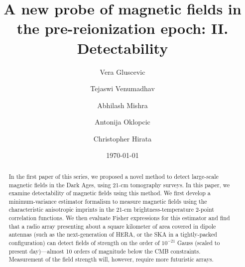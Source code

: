 \documentclass[aps,prd,twocolumn,floatfix,showpacs,superscriptaddress,nofootinbib]{revtex4-1}
\begin{document}
\widetext
\title{A new probe of magnetic fields in the pre-reionization epoch: II. Detectability}
\author{Vera Gluscevic}
\author{Tejaswi Venumadhav}
\author{Abhilash Mishra} 
\author{Antonija Oklopcic}
\author{Christopher Hirata}
\date{\today}
 

\begin{abstract}
In the first paper of this series, we proposed a novel method to detect large-scale magnetic fields in the Dark Ages, using 21-cm tomography surveys. In this paper, we examine detectability of magnetic fields using this method. We first develop a minimum-variance estimator formalism to measure magnetic fields using the characteristic anisotropic imprints in the 21-cm brightness-temperature 2-point correlation functions. We then evaluate Fisher expressions for this estimator and find that a radio array presenting about a square kilometer of area covered in dipole antennas (such as the next-generation of HERA, or the SKA in a tightly-packed configuration) can detect fields of strength on the order of $10^{-21}$ Gauss (scaled to present day)---almost 10 orders of magnitude below the CMB constraints. Measurement of the field strength will, however, require more futuristic arrays.%
\end{abstract} 
  
\pacs{} 
\maketitle

\vspace{-15pt}






  
\appendix 

\label{app:Vrms}



\end{document}
